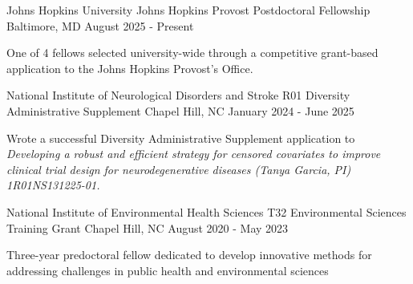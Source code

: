 

\begin{cventries}

\cventry
{Johns Hopkins University} %
{Johns Hopkins Provost Postdoctoral Fellowship} %
{Baltimore, MD} %
{August 2025 - Present} %
{
\begin{cvitems} %
\item One of 4 fellows selected university-wide through a competitive grant-based application to the Johns Hopkins Provost's Office.
  \end{cvitems}
}

\cventry
{National Institute of Neurological Disorders and Stroke} %
{R01 Diversity Administrative Supplement} %
{Chapel Hill, NC} %
{January 2024 - June 2025} %
{
\begin{cvitems} %
\item Wrote a successful Diversity Administrative Supplement application to \textit{Developing a robust and efficient strategy for \newline censored covariates to improve clinical trial design for neurodegenerative diseases (Tanya Garcia, PI) 1R01NS131225-01.} 
  \end{cvitems}
}

\cventry
{National Institute of Environmental Health Sciences} %
{T32 Environmental Sciences Training Grant} %
{Chapel Hill, NC} %
{August 2020 - May 2023} %
{
\begin{cvitems} %
\item Three-year predoctoral fellow dedicated to develop innovative methods for addressing challenges \newline in public health and environmental sciences 
  \end{cvitems}
}



\end{cventries}
